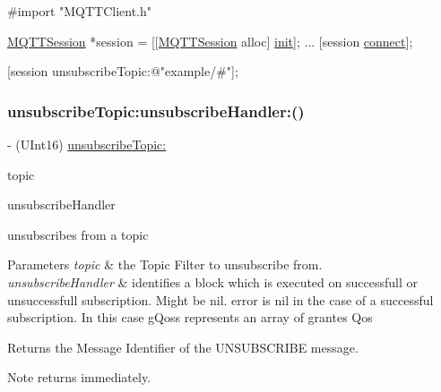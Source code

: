 \begin{DoxyCode}
\textcolor{preprocessor}{#import "MQTTClient.h"}

\hyperlink{interface_m_q_t_t_session}{MQTTSession} *session = [[\hyperlink{interface_m_q_t_t_session}{MQTTSession} alloc] \hyperlink{interface_m_q_t_t_session_aee55d52a9b6395f1a0d73b672900629c}{init}];
...
[session \hyperlink{interface_m_q_t_t_session_ad443eb80793d71150a825513303405b5}{connect}];

[session unsubscribeTopic:\textcolor{stringliteral}{@"example/#"}];
\end{DoxyCode}
 \mbox{\label{interface_m_q_t_t_session_a49e7dde1369377da92ae0f7fc2eb187f}} 
\subsubsection{\texorpdfstring{unsubscribe\+Topic\+:unsubscribe\+Handler\+:()}{unsubscribeTopic:unsubscribeHandler:()}}
{\footnotesize\ttfamily -\/ (U\+Int16) \hyperlink{interface_m_q_t_t_session_a0b9b75a7232586150cbc348b1262faaf}{unsubscribe\+Topic\+:} \begin{DoxyParamCaption}\item[{(N\+S\+String $\ast$)}]{topic }\item[{unsubscribeHandler:(M\+Q\+T\+T\+Unsubscribe\+Handler)}]{unsubscribe\+Handler }\end{DoxyParamCaption}}

unsubscribes from a topic


\begin{DoxyParams}{Parameters}
{\em topic} & the Topic Filter to unsubscribe from. \\
\hline
{\em unsubscribe\+Handler} & identifies a block which is executed on successfull or unsuccessfull subscription. Might be nil. error is nil in the case of a successful subscription. In this case g\+Qoss represents an array of grantes Qos\\
\hline
\end{DoxyParams}
\begin{DoxyReturn}{Returns}
the Message Identifier of the U\+N\+S\+U\+B\+S\+C\+R\+I\+BE message.
\end{DoxyReturn}
\begin{DoxyNote}{Note}
returns immediately. 
\end{DoxyNote}
\mbox{\label{interface_m_q_t_t_session_ac93b09cbe98c4b8754180e344ef7e908}} 
